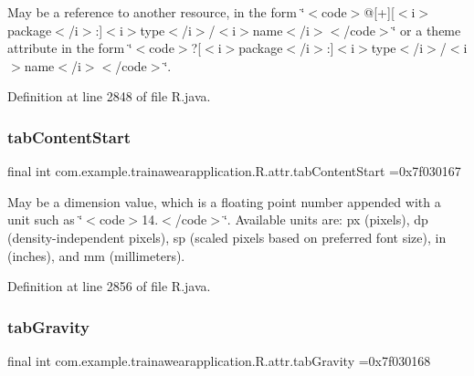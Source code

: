 May be a reference to another resource, in the form \char`\"{}$<$code$>$@\mbox{[}+\mbox{]}\mbox{[}$<$i$>$package$<$/i$>$\+:\mbox{]}$<$i$>$type$<$/i$>$/$<$i$>$name$<$/i$>$$<$/code$>$\char`\"{} or a theme attribute in the form \char`\"{}$<$code$>$?\mbox{[}$<$i$>$package$<$/i$>$\+:\mbox{]}$<$i$>$type$<$/i$>$/$<$i$>$name$<$/i$>$$<$/code$>$\char`\"{}. 

Definition at line 2848 of file R.\+java.

\mbox{\label{classcom_1_1example_1_1trainawearapplication_1_1_r_1_1attr_a421d4eaaa9accf369340006562707879}} 
\subsubsection{\texorpdfstring{tabContentStart}{tabContentStart}}
{\footnotesize\ttfamily final int com.\+example.\+trainawearapplication.\+R.\+attr.\+tab\+Content\+Start =0x7f030167\hspace{0.3cm}{\ttfamily [static]}}

May be a dimension value, which is a floating point number appended with a unit such as \char`\"{}$<$code$>$14.\+5sp$<$/code$>$\char`\"{}. Available units are\+: px (pixels), dp (density-\/independent pixels), sp (scaled pixels based on preferred font size), in (inches), and mm (millimeters). 

Definition at line 2856 of file R.\+java.

\mbox{\label{classcom_1_1example_1_1trainawearapplication_1_1_r_1_1attr_ad1e0d1b9905a0b0c8fc53428f7de9e4d}} 
\subsubsection{\texorpdfstring{tabGravity}{tabGravity}}
{\footnotesize\ttfamily final int com.\+example.\+trainawearapplication.\+R.\+attr.\+tab\+Gravity =0x7f030168\hspace{0.3cm}{\ttfamily [static]}}


